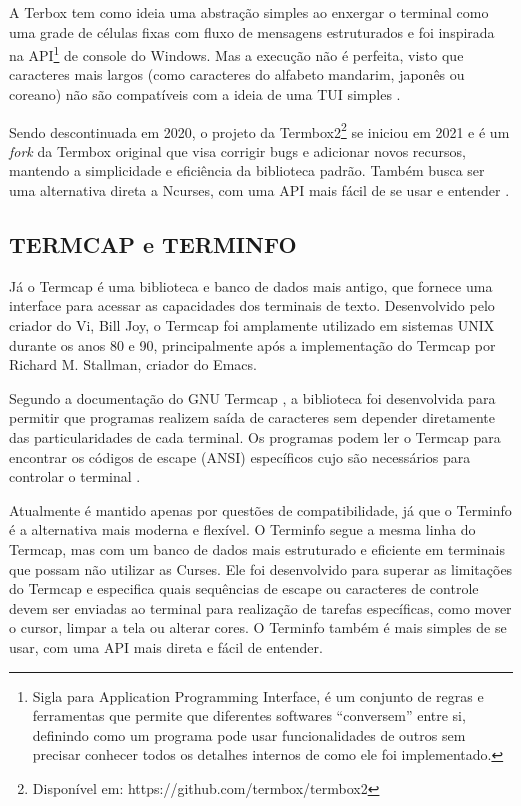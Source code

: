 A Terbox tem como ideia uma abstração simples ao enxergar o terminal como uma
grade de células fixas com fluxo de mensagens estruturados e foi inspirada na
API\footnote{Sigla para Application Programming Interface, é um conjunto de regras
e ferramentas que permite que diferentes softwares “conversem” entre si,
definindo como um programa pode usar funcionalidades de outros sem precisar
conhecer todos os detalhes internos de como ele foi implementado.} de console do
Windows. Mas a execução não é perfeita, visto que caracteres mais largos (como
caracteres do alfabeto mandarim, japonês ou coreano) não são compatíveis com a
ideia de uma TUI simples \cite{termbox_googlecode}.

Sendo descontinuada em 2020, o projeto da Termbox2\footnote{Disponível em: https://github.com/termbox/termbox2}
se iniciou em 2021 e é um \textit{fork} da Termbox original que visa corrigir bugs
e adicionar novos recursos, mantendo a simplicidade e eficiência da biblioteca
padrão. Também busca ser uma alternativa direta a Ncurses, com uma API mais
fácil de se usar e entender \cite{termbox2_github}.

\subsection{TERMCAP e TERMINFO}

Já o Termcap é uma biblioteca e banco de dados mais antigo, que fornece uma
interface para acessar as capacidades dos terminais de texto. Desenvolvido pelo criador
do Vi, Bill Joy, o Termcap foi amplamente utilizado em sistemas UNIX durante os anos
80 e 90, principalmente após a implementação do Termcap por Richard M. Stallman,
criador do Emacs.

Segundo a documentação do GNU Termcap \cite{stallman_termcap}, a biblioteca foi desenvolvida
para permitir que programas realizem saída de caracteres sem depender diretamente
das particularidades de cada terminal. Os programas podem ler o Termcap para
encontrar os códigos de escape (ANSI) específicos cujo são necessários para
controlar o terminal \cite{kerrisk_termcap_man7}.

Atualmente é mantido apenas por questões de compatibilidade, já que o Terminfo é
a alternativa mais moderna e flexível. O Terminfo segue a mesma linha do Termcap,
mas com um banco de dados mais estruturado e eficiente em terminais que possam não
utilizar as Curses. Ele foi desenvolvido para superar as limitações do Termcap e
especifica quais sequências de escape ou caracteres de controle devem ser
enviadas ao terminal para realização de tarefas específicas, como mover o cursor,
limpar a tela ou alterar cores. O Terminfo também é mais simples de se usar, com
uma API mais direta e fácil de entender. \cite{man7_terminfo, tldp_text_terminal_howto}

